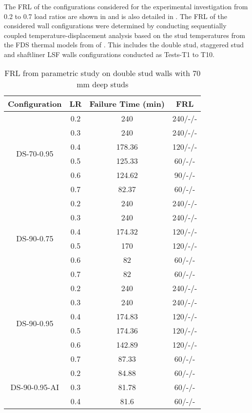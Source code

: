 The FRL of the configurations considered for the experimental investigation from 0.2 to 0.7 load ratios are shown in  and is also detailed in . The FRL of the considered wall configurations were determined by conducting sequentially coupled temperature-displacement analysis based on the stud temperatures from the FDS thermal models from  of . This includes the double stud, staggered stud and shaftliner LSF walls configurations conducted as Tests-T1 to T10. 
\begin{table}[!htbp]
	\centering
	\caption{FRL from parametric study on double stud walls with 70 mm deep studs}
	  \begin{tabular}{cccc}
	  \toprule
	  Configuration & LR    & Failure Time (min) & FRL \\
	  \midrule
	  \multirow{6}[2]{*}{DS-70-0.95} & 0.2   & 240   & 240/-/- \\
			& 0.3   & 240   & 240/-/- \\
			& 0.4   & 178.36 & 120/-/- \\
			& 0.5   & 125.33 & 60/-/- \\
			& 0.6   & 124.62 & 90/-/- \\
			& 0.7   & 82.37 & 60/-/- \\
	  \midrule
	  \multirow{6}[2]{*}{DS-90-0.75} & 0.2   & 240   & 240/-/- \\
			& 0.3   & 240   & 240/-/- \\
			& 0.4   & 174.32 & 120/-/- \\
			& 0.5   & 170   & 120/-/- \\
			& 0.6   & 82    & 60/-/- \\
			& 0.7   & 82    & 60/-/- \\
	  \midrule
	  \multirow{6}[2]{*}{DS-90-0.95} & 0.2   & 240   & 240/-/- \\
			& 0.3   & 240   & 240/-/- \\
			& 0.4   & 174.83 & 120/-/- \\
			& 0.5   & 174.36 & 120/-/- \\
			& 0.6   & 142.89 & 120/-/- \\
			& 0.7   & 87.33 & 60/-/- \\
	  \midrule
	  \multirow{6}[2]{*}{DS-90-0.95-AI} & 0.2   & 84.88 & 60/-/- \\
			& 0.3   & 81.78 & 60/-/- \\
			& 0.4   & 81.6  & 60/-/- \\

\end{tabular}
\end{table}
